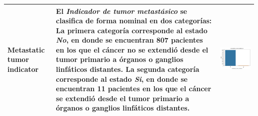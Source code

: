 \begin{table}[!htb]
\begin{threeparttable}
\begin{tabular}{p{2.5cm} p{7cm} p{6.5cm}}
			Metastatic tumor indicator
			& El \textit{Indicador de tumor metastásico} se clasifica de forma nominal en dos categorías: La primera categoría corresponde al estado \textit{No}, en donde se encuentran 807 pacientes en los que el cáncer no se extendió desde el tumor primario a órganos o ganglios linfáticos distantes. La segunda categoría corresponde al estado \textit{Si}, en donde se encuentran 11 pacientes en los que el cáncer se extendió desde el tumor primario a órganos o ganglios linfáticos distantes.
			
			& \begin{center}\includegraphics[width=1\linewidth]{NOTEBOOK/IMAGENES_DESCRIPTIVAS/33_metastatic_tumor_indicator}\end{center}
			\\ \hline
			

\end{tabular}
\end{threeparttable}
\end{table}
